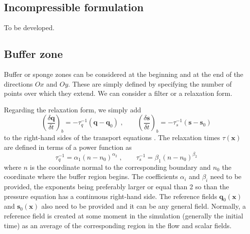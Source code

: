 \subsection{Incompressible formulation}

To be developed.

\subsection{Buffer zone}\label{sec:buffer}

Buffer or sponge zones can be considered at the beginning and at the end of the
directions $Ox$ and $Oy$. These are simply defined by specifying the number of
points over which they extend. We can consider a filter or a relaxation form.

Regarding the relaxation form, we simply add
\begin{equation}
    \left(\frac{\delta \mathbf{q}}{\delta t}\right)_b=-\tau_q^{-1}(\mathbf{q}-\mathbf{q}_0)
    \;,\qquad
    \left(\frac{\delta \mathbf{s}}{\delta t}\right)_b=-\tau_s^{-1}(\mathbf{s}-\mathbf{s}_0)
\end{equation}
to the right-hand sides of the transport equations \citep{Hu:1996b}.  The
relaxation times $\tau(\mathbf{x})$ are defined in terms of a power function as
\begin{equation}
    \tau_q^{-1}=\alpha_1(n-n_0)^{\alpha_2} \;,\qquad
    \tau_s^{-1}=\beta_1(n-n_0)^{\beta_2}
\end{equation}
where $n$ is the coordinate normal to the corresponding boundary and $n_0$ the
coordinate where the buffer region begins. The coefficients $\alpha_i$ and
$\beta_i$ need to be provided, the exponents being preferably larger or equal
than 2 so than the pressure equation has a continuous right-hand side.  The
reference fields $\mathbf{q}_0(\mathbf{x})$ and $\mathbf{s}_0(\mathbf{x})$ also
need to be provided and it can be any general field. Normally, a reference field
is created at some moment in the simulation (generally the initial time) as an
average of the corresponding region in the flow and scalar fields.
